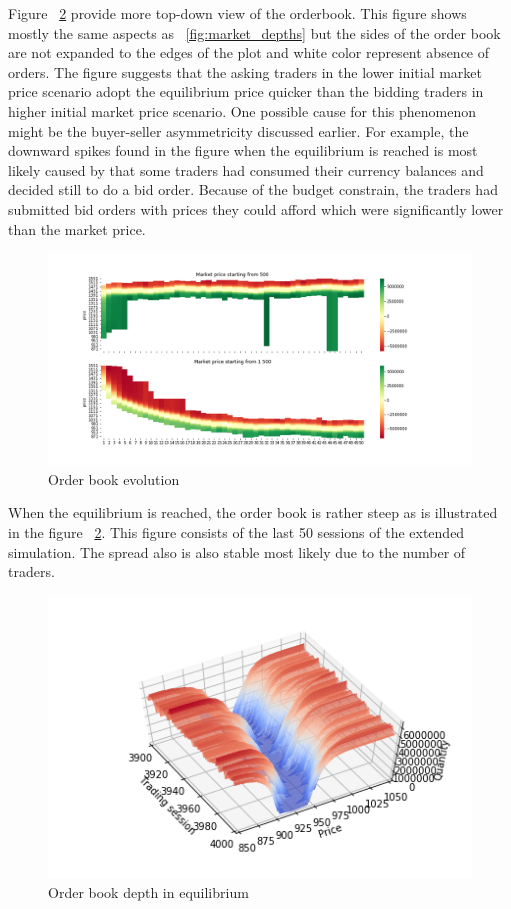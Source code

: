 Figure ~\ref{fig:basic_orderbook_evo} provide more top-down view of the orderbook.
This figure shows mostly the same aspects as ~\ref{fig:market_depths} but the sides of the 
order book are not expanded to the edges of the plot and white color represent absence of orders.
The figure suggests that the asking traders in the lower initial market price scenario
adopt the equilibrium price quicker than the bidding traders in higher initial market 
price scenario. One possible cause for this phenomenon might be the buyer-seller asymmetricity
discussed earlier. For example, the downward spikes found in the figure when the equilibrium
is reached is most likely caused by that some traders had consumed their currency balances and decided 
still to do a bid order. Because of the budget constrain, the traders had submitted bid orders with prices
they could afford which were significantly lower than the market price.

\begin{figure}
    \includegraphics[width=\linewidth]{plots/basic_order_book_evo.png}
    \caption{Order book evolution}
    \label{fig:basic_orderbook_evo}
\end{figure}

When the equilibrium is reached, the order book is rather steep as is illustrated in the figure
~\ref{fig:basic_orderbook_evo}. This figure consists of the last 50 sessions of the extended simulation.
The spread also is also stable most likely due to the number of traders. 

\begin{figure}
    \includegraphics[width=\linewidth]{plots/basic_market_depth_in_equilibrium.png}
    \caption{Order book depth in equilibrium}
    \label{fig:basic_orderbook_evo}
\end{figure}


